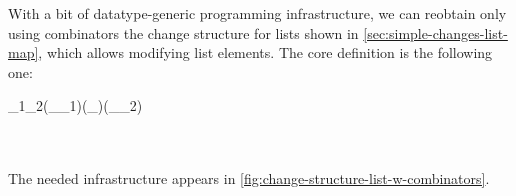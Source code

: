 With a bit of datatype-generic programming infrastructure, we can reobtain only
using combinators the change
structure for lists shown in \cref{sec:simple-changes-list-map}, which allows
modifying list elements. The core definition is the following one:
\begin{hscode}\SaveRestoreHook
{}%
%
%
%
\>[B]{}\mathrel{:\mkern-1mu:}\;_{1}\;\;_{2}\to {}\;(_{\mu}\;_{1})\;(_{\mu}\;)\;(_{\mu}\;_{2}){}\<[E]%
\\
\>[B]{}\;\mathrel{=}\;\<[E]%
\\
\>[B]{}\<[5]%
\>[5]{}\mathrel{=}{}\<[11]%
\>[11]{}\;\;\;\mathrel{\$}{}\<[E]%
\\
\>[11]{}\;\mathrel{\$}\;\;\<[E]%
\ColumnHook
\end{hscode}\resethooks
The needed infrastructure appears in \cref{fig:change-structure-list-w-combinators}.


